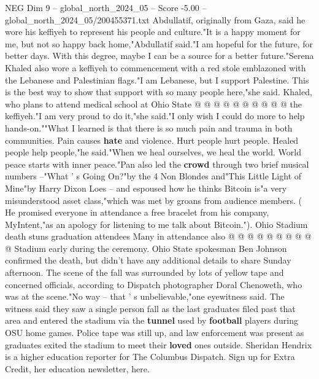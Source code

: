\begin{textsample}{NEG Dim 9 – global\_north\_2024\_05 – Score -5.00 – global\_north\_2024\_05/200455371.txt}
Abdullatif, originally from Gaza, said he wore his keffiyeh to represent his people and culture."It is a happy moment for me, but not so happy back home,"Abdullatif said."I am hopeful for the future, for better days.
With this degree, maybe I can be a source for a better future."Serena Khaled also wore a keffiyeh to commencement with a red stole emblazoned with the Lebanese and Palestinian flags."I am Lebanese, but I support Palestine.
This is the best way to show that support with so many people here,"she said.
Khaled, who plans to attend medical school at Ohio State @ @ @ @ @ @ @ @ @ @ the keffiyeh."I am very proud to do it,"she said."I only wish I could do more to help hands-on.""What I learned is that there is so much pain and trauma in both communities.
Pain causes \textbf{hate} and violence.
Hurt people hurt people.
Healed people help people,"he said."When we heal ourselves, we heal the world.
World peace starts with inner peace."Pan also led the \textbf{crowd} through two brief musical numbers --"What ' s Going On?"by the 4 Non Blondes and"This Little Light of Mine"by Harry Dixon Loes -- and espoused how he thinks Bitcoin is"a very misunderstood asset class,"which was met by groans from audience members. ( He promised everyone in attendance a free bracelet from his company, MyIntent,"as an apology for listening to me talk about Bitcoin.").
Ohio Stadium death stuns graduation attendees Many in attendance also @ @ @ @ @ @ @ @ @ @ Stadium early during the ceremony.
Ohio State spokesman Ben Johnson confirmed the death, but didn't have any additional details to share Sunday afternoon.
The scene of the fall was surrounded by lots of yellow tape and concerned officials, according to Dispatch photographer Doral Chenoweth, who was at the scene."No way -- that ' s unbelievable,"one eyewitness said.
The witness said they saw a single person fall as the last graduates filed past that area and entered the stadium via the \textbf{tunnel} used by \textbf{football} players during OSU home games.
Police tape was still up, and law enforcement was present as graduates exited the stadium to meet their \textbf{loved} ones outside.
Sheridan Hendrix is a higher education reporter for The Columbus Dispatch.
Sign up for Extra Credit, her education newsletter, here.

\end{textsample}
